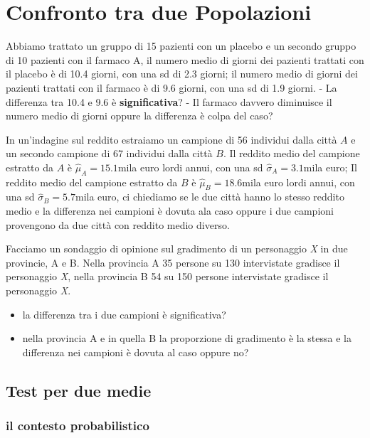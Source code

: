\documentclass[
  11pt,
]{book}
\providecommand{\tightlist}{%
  \setlength{\itemsep}{0pt}\setlength{\parskip}{0pt}}
\theoremstyle{mytheoremstyle}
\theoremstyle{mydefstyle}
\begin{document}
\normalsize

\chapter{Confronto tra due Popolazioni}\label{confronto-tra-due-popolazioni}

Abbiamo trattato un gruppo di 15 pazienti con un placebo e un secondo gruppo di 10 pazienti con il farmaco A, il numero medio di giorni dei pazienti trattati con il placebo è di 10.4 giorni, con una sd di 2.3 giorni; il numero medio di giorni dei pazienti trattati con il farmaco è di 9.6 giorni, con una sd di 1.9 giorni.
- La differenza tra 10.4 e 9.6 è \textbf{significativa}?
- Il farmaco davvero diminuisce il numero medio di giorni oppure la differenza è colpa del caso?

In un'indagine sul reddito estraiamo un campione di 56 individui dalla città \(A\) e un secondo campione di 67 individui dalla città \(B\).
Il reddito medio del campione estratto da \(A\) è \(\hat\mu_A=15.1\)mila euro lordi annui, con una sd \(\hat\sigma_A=3.1\)mila euro; Il reddito medio del campione estratto da \(B\) è \(\hat\mu_B=18.6\)mila euro lordi annui, con una sd \(\hat\sigma_B=5.7\)mila euro, ci chiediamo se le due città hanno lo stesso reddito medio e la differenza nei campioni è dovuta ala caso oppure i due campioni provengono da due città con reddito medio diverso.

Facciamo un sondaggio di opinione sul gradimento di un personaggio \emph{X} in due provincie, A e B. Nella provincia A 35 persone su 130 intervistate gradisce il personaggio \emph{X}, nella provincia B 54 su 150 persone intervistate gradisce il personaggio \emph{X}.

\begin{itemize}
\tightlist
\item
  la differenza tra i due campioni è significativa?
\item
  nella provincia A e in quella B la proporzione di gradimento è la stessa e la differenza nei campioni è dovuta al caso oppure no?
\end{itemize}

\section{Test per due medie}\label{test-per-due-medie}

\subsection{il contesto probabilistico}\label{il-contesto-probabilistico-1}
\end{document}
